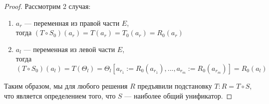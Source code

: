 \begin{proof}
		Рассмотрим 2 случая:
		\begin{enumerate}
			\item $a_r$ --- переменная из правой части $E$, \\
			тогда $(T \circ S_0)(a_r) = T(a_r) = T_0(a_r) = R_0(a_r)$
			\item $a_l$ --- переменная из левой части $E$, \\
			тогда $(T \circ S_0)(a_l) = T(\Theta_l) = \Theta_l[a_{r_1}:=R_0(a_{r_1}),...,a_{r_m}:=R_0(a_{r_m})] = R_0(a_l)$
		\end{enumerate}
	Таким образом, мы для любого решения $R$ предъявили подстановку $T : R = T \circ S$, что является определением того, что $S$ --- наиболее общий унификатор.
	\end{proof}
